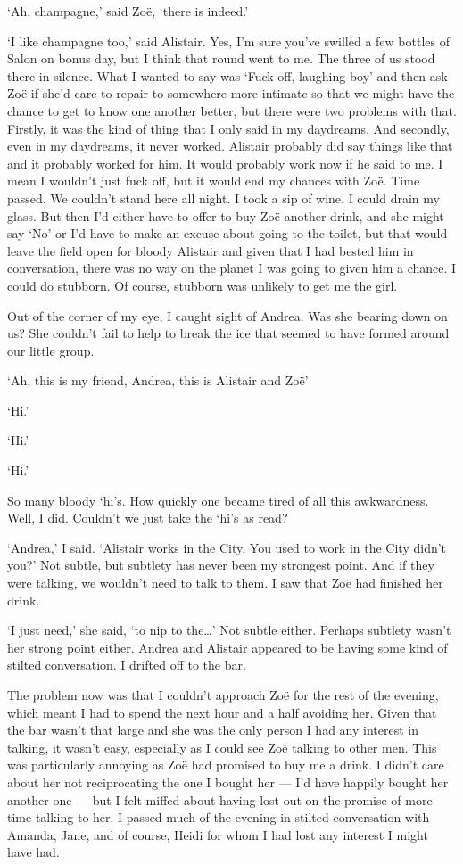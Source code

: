 `Ah, champagne,' said Zoë, `there is indeed.'

`I like champagne too,' said Alistair. Yes, I'm sure you've swilled
a few bottles of Salon on bonus day, but I think that round went to
me. The three of us stood there in silence. What I wanted to say was
`Fuck off, laughing boy' and then ask Zoë if she'd care to
repair to somewhere more intimate so that we might have the chance
to get to know one another better, but there were two problems with
that. Firstly, it was the kind of thing that I only said in my
daydreams. And secondly, even in my daydreams, it never worked.
Alistair probably did say things like that and it probably worked
for him. It would probably work now if he said to me. I mean I wouldn't just fuck off, but it would end my chances with Zoë.
Time passed. We couldn't stand here all night. I took a sip
of wine. I could drain my glass. But then I'd either have to offer
to buy Zoë another drink, and she might say `No' or I'd have to
make an excuse about going to the toilet, but that would leave the
field open for bloody Alistair and given that I had bested him in
conversation, there was no way on the planet I was going to given
him a chance. I could do stubborn. Of course, stubborn was unlikely
to get me the girl.

Out of the corner of my eye, I caught sight of Andrea. Was she
bearing down on us? She couldn't fail to help to break the ice that
seemed to have formed around our little group.

`Ah, this is my friend, Andrea, this is Alistair and Zoë'

`Hi.'

`Hi.'

`Hi.'

So many bloody `hi's. How quickly one became tired of all this
awkwardness. Well, I did. Couldn't we just take the `hi's as read?

`Andrea,' I said. `Alistair works in the City. You used to work in
the City didn't you?' Not subtle, but subtlety has never been my
strongest point. And if they were talking, we wouldn't need to talk to
them. I saw that Zoë had finished her drink.

`I just need,' she said, `to nip to the\dots' Not subtle either.
Perhaps subtlety wasn't her strong point either. Andrea and Alistair
appeared to be having some kind of stilted conversation. I drifted
off to the bar.

The problem now was that I couldn't approach Zoë for the rest of
the evening, which meant I had to spend the next hour and a half
avoiding her. Given that the bar wasn't that large and she was the
only person I had any interest in talking, it wasn't easy,
especially as I could see Zoë talking to other men. This was particularly annoying as Zoë had promised to buy me a drink. I didn't care about her not reciprocating the one I bought her --- I'd have happily bought her another one --- but I felt miffed about having lost out on the promise of more time talking to her. I passed
much of the evening in stilted conversation with Amanda, Jane, and
of course, Heidi for whom I had lost any interest I might have had.

